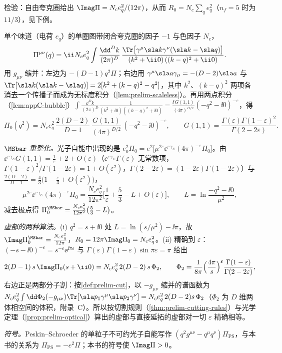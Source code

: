 检验：自由夸克圈给出 $\Imag\Pi=N_ce_q^2/(12\pi)$，从而 $R_0=N_c\sum_qe_q^2$（$n_f=5$ 时为 $11/3$），见下例。%

\begin{example}[维数正规化中的单圈无质量流关联函数]\label{ex:prelim-vacpol}
单个味道（电荷 $e_q$）的单圈图带闭合夸克圈的因子 $-1$ 与色因子 $N_c$，
\[
\Pi^{\mu\nu}(q)=\ii N_ce_q^2\int\frac{\dd^Dk}{(2\pi)^D}\,\frac{\Tr\big[\gamma^\mu\sla k\gamma^\nu(\sla k-\sla q)\big]}{(k^2+\ii0)\,((k-q)^2+\ii0)} .
\]
用 $g_{\mu\nu}$ 缩并：左边为 $-(D-1)q^2\Pi$；右边用 $\gamma^\mu\sla a\gamma_\mu=-(D-2)\sla a$ 与 $\Tr[\sla k(\sla k-\sla q)]=2[k^2+(k-q)^2-q^2]$，其中 $k^2$、$(k-q)^2$ 两项各消去一个传播子而成为无标度积分（\cref{lem:prelim-scaleless}）。再用两点积分（\cref{lem:appC-bubble}）$\int\frac{\dd^Dk}{(2\pi)^D}\frac1{(k^2+\ii0)((k-q)^2+\ii0)}=\frac{\ii\,G(1,1)}{(4\pi)^{D/2}}(-q^2-\ii0)^{-\varepsilon}$，得
\begin{equation}\label{eq:prelim-Pi0}
\Pi_0(q^2)=N_ce_q^2\,\frac{2(D-2)}{D-1}\,\frac{G(1,1)}{(4\pi)^{D/2}}\,(-q^2-\ii0)^{-\varepsilon},\qquad G(1,1)=\frac{\Gamma(\varepsilon)\Gamma(1-\varepsilon)^2}{\Gamma(2-2\varepsilon)}. %
\end{equation}
\par
\emph{$\MSbar$ 重整化。}光子自能中出现的是 $e_0^2\Pi_0=e^2\big[\mu^{2\varepsilon}\ee^{\varepsilon\gamma_E}(4\pi)^{-\varepsilon}\Pi_0\big]$。由 $\ee^{\varepsilon\gamma_E}G(1,1)=\frac1\varepsilon+2+O(\varepsilon)$（$\ee^{\varepsilon\gamma_E}\Gamma(\varepsilon)$ 无常数项，$\Gamma(1-\varepsilon)^2/\Gamma(1-2\varepsilon)=1+O(\varepsilon^2)$，$\Gamma(2-2\varepsilon)=(1-2\varepsilon)\Gamma(1-2\varepsilon)$）与 $\frac{2(D-2)}{D-1}=\frac43\big(1-\frac\varepsilon3+O(\varepsilon^2)\big)$，
\[
\mu^{2\varepsilon}\ee^{\varepsilon\gamma_E}(4\pi)^{-\varepsilon}\Pi_0=\frac{N_ce_q^2}{12\pi^2}\Big[\frac1\varepsilon+\frac53-L+O(\varepsilon)\Big],\qquad L=\ln\frac{-q^2-\ii0}{\mu^2},
\]
减去极点得 $\Pi_0^{\MSbar}=\frac{N_ce_q^2}{12\pi^2}\big(\frac53-L\big)$。
\par
\emph{虚部的两种算法。}(i) $q^2=s+\ii0$ 处 $L=\ln(s/\mu^2)-\ii\pi$，故 $\Imag\Pi_0^{\MSbar}=\frac{N_ce_q^2}{12\pi}$，$R_0=12\pi\Imag\Pi_0=N_ce_q^2$。(ii) 精确到 $\varepsilon$：$(-s-\ii0)^{-\varepsilon}=s^{-\varepsilon}\ee^{\ii\pi\varepsilon}$ 与 $\Gamma(\varepsilon)\Gamma(1-\varepsilon)\sin\pi\varepsilon=\pi$ 给出
\[
2(D-1)\,s\,\Imag\Pi_0(s+\ii0)=N_ce_q^2\,2(D-2)\,s\,\Phi_2,\qquad \Phi_2=\frac1{8\pi}\Big(\frac{4\pi}{s}\Big)^{\varepsilon}\frac{\Gamma(1-\varepsilon)}{\Gamma(2-2\varepsilon)},
\]
右边正是两部分子割：按\cref{def:prelim-cut}，以 $-g_{\mu\nu}$ 缩并的谱函数为 $N_ce_q^2\int\dd\Phi_2(-g_{\mu\nu})\Tr[\sla p_1\gamma^\mu\sla p_2\gamma^\nu]=N_ce_q^2\,2(D-2)s\,\Phi_2$（$\Phi_2$ 为 $D$ 维两体相空间的体积，附录~C）。所以按切割规则（\cref{thm:prelim-cutting-rules}）与光学定理（\cref{prop:prelim-optical}）算出的虚部与直接延拓的虚部对一切 $\varepsilon$ 精确相等。
\par
\emph{符号。}Peskin--Schroeder 的单粒子不可约光子自能写作 $(q^2g^{\mu\nu}-q^\mu q^\nu)\Pi_{\mathrm{PS}}$，与本书的关系为 $\Pi_{\mathrm{PS}}=-e^2\Pi$；本书的符号使 $\Imag\Pi>0$。
\end{example}

